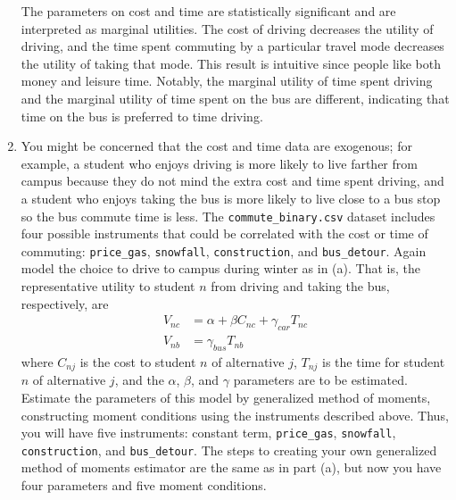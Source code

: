 \documentclass[11pt,letterpaper]{article}\usepackage[]{graphicx}\usepackage[]{color}
\begin{document}
\begin{enumerate}[label=\alph*., leftmargin=*]
	The parameters on cost and time are statistically significant and are interpreted as marginal utilities. The cost of driving decreases the utility of driving, and the time spent commuting by a particular travel mode decreases the utility of taking that mode. This result is intuitive since people like both money and leisure time. Notably, the marginal utility of time spent driving and the marginal utility of time spent on the bus are different, indicating that time on the bus is preferred to time driving.

	\item You might be concerned that the cost and time data are exogenous; for example, a student who enjoys driving is more likely to live farther from campus because they do not mind the extra cost and time spent driving, and a student who enjoys taking the bus is more likely to live close to a bus stop so the bus commute time is less. The \texttt{commute\_binary.csv} dataset includes four possible instruments that could be correlated with the cost or time of commuting: \texttt{price\_gas}, \texttt{snowfall}, \texttt{construction}, and \texttt{bus\_detour}. Again model the choice to drive to campus during winter as in (a). That is, the representative utility to student $n$ from driving and taking the bus, respectively, are
	\begin{align*}
		V_{nc} & = \alpha + \beta C_{nc} + \gamma_{car} T_{nc} \\
		V_{nb} & = \gamma_{bus} T_{nb}
	\end{align*}
	where $C_{nj}$ is the cost to student $n$ of alternative $j$, $T_{nj}$ is the time for student $n$ of alternative $j$, and the $\alpha$, $\beta$, and $\gamma$ parameters are to be estimated. Estimate the parameters of this model by generalized method of moments, constructing moment conditions using the instruments described above. Thus, you will have five instruments: constant term, \texttt{price\_gas}, \texttt{snowfall}, \texttt{construction}, and \texttt{bus\_detour}. The steps to creating your own generalized method of moments estimator are the same as in part (a), but now you have four parameters and five moment conditions.


\end{enumerate}
\end{document}

